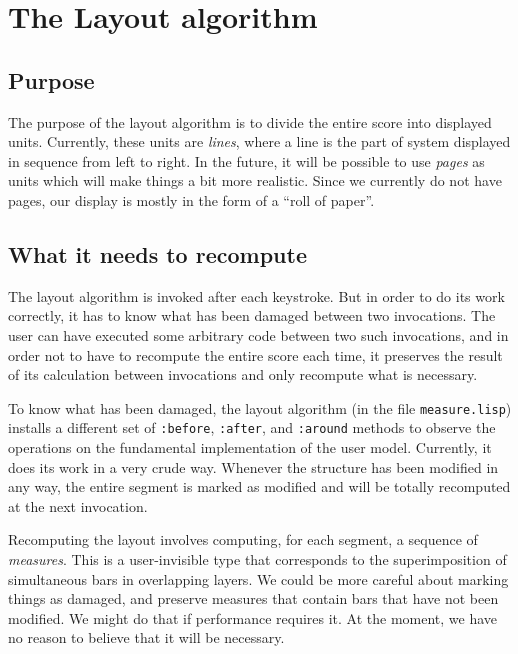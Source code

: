 \chapter{The Layout algorithm}

\section{Purpose}

The purpose of the layout algorithm is to divide the entire score into
displayed units.  Currently, these units are \emph{lines}, where a
line is the part of system displayed in sequence from left to right.
In the future, it will be possible to use \emph{pages} as units which
will make things a bit more realistic.  Since we currently do not have
pages, our display is mostly in the form of a ``roll of paper''.

\section{What it needs to recompute}

The layout algorithm is invoked after each keystroke.  But in order to
do its work correctly, it has to know what has been damaged between
two invocations.  The user can have executed some arbitrary code
between two such invocations, and in order not to have to recompute
the entire score each time, it preserves the result of its calculation
between invocations and only recompute what is necessary. 

To know what has been damaged, the layout algorithm (in the file
\texttt{measure.lisp}) installs a different set of \texttt{:before},
\texttt{:after}, and \texttt{:around} methods to observe the
operations on the fundamental implementation of the user model.
Currently, it does its work in a very crude way.  Whenever the
structure has been modified in any way, the entire segment is marked
as modified and will be totally recomputed at the next invocation. 

Recomputing the layout involves computing, for each segment, a
sequence of \emph{measures}.  This is a user-invisible
type that corresponds to the superimposition of simultaneous bars in
overlapping layers.  We could be more careful about marking things as
damaged, and preserve measures that contain bars that have not been
modified.  We might do that if performance requires it.  At the
moment, we have no reason to believe that it will be necessary.  

